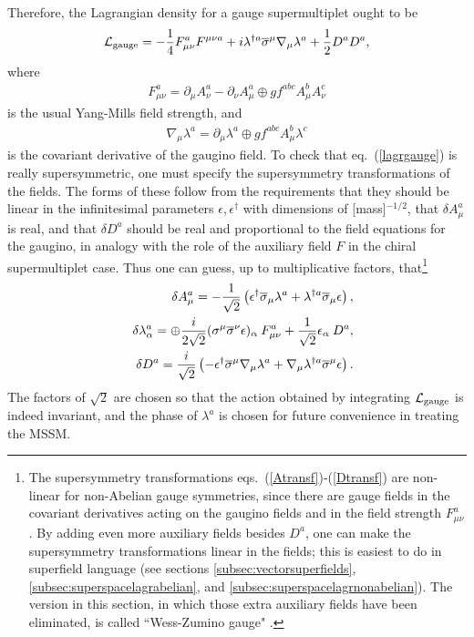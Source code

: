 \documentclass[11pt]{article}
\def\BDneg{-}
\def\BDminus{-}
\def\BDneg{}
\def\BDminus{+}
\def\BDneg{\ominus}
\def\BDminus{\ominus}
\def\BDneg{\oplus}
\def\BDminus{\oplus}
\def\beq{\begin{eqnarray}}
\def\eeq{\end{eqnarray}}
\def\lagr{{\cal L}}
\def\sigmabar{\overline\sigma}
\begin{document}
Therefore, the Lagrangian density for a gauge supermultiplet ought to be
\beq
\lagr_{\rm gauge} = -{1\over 4} F_{\mu\nu}^a F^{\mu\nu a}
+ i \lambda^{\dagger a} \sigmabar^\mu \nabla_\mu \lambda^a
+ {1\over 2} D^a D^a ,
\label{lagrgauge}
\eeq
where
\beq
F^a_{\mu\nu} = \partial_\mu A^a_\nu - \partial_\nu A^a_\mu 
               \BDminus g f^{abc} A^b_\mu A^c_\nu
\label{eq:YMfs}
\eeq
is the usual Yang-Mills field strength, and
\beq
\nabla_\mu \lambda^a = \partial_\mu \lambda^a 
                  \BDminus g f^{abc} A^b_\mu \lambda^c
\label{ordtocovlambda}
\eeq
is the covariant derivative of the gaugino field. To check that
eq.~(\ref{lagrgauge}) is really supersymmetric, one must specify the
supersymmetry transformations of the fields. 
The forms of these follow from the requirements that they should be linear
in the infinitesimal parameters $\epsilon,\epsilon^\dagger$ with
dimensions of [mass]$^{-1/2}$, that $\delta A^a_\mu$ is real, and that
$\delta D^a$ should be real and proportional to the field equations for
the gaugino, in analogy with the role of the auxiliary field $F$ in the
chiral supermultiplet case. Thus one can guess, up to multiplicative
factors, that\footnote{The supersymmetry transformations
eqs.~(\ref{Atransf})-(\ref{Dtransf}) are non-linear for non-Abelian gauge
symmetries, since there are gauge fields in the covariant
derivatives acting on the gaugino fields and in the field strength $F_{\mu
\nu}^a$. By adding even more auxiliary fields besides $D^a$, one can make
the supersymmetry transformations linear in the fields; this is easiest to
do in superfield language (see sections \ref{subsec:vectorsuperfields}, 
\ref{subsec:superspacelagrabelian}, and \ref{subsec:superspacelagrnonabelian}). 
The version in this section, in which those extra auxiliary fields 
have been eliminated, is called ``Wess-Zumino gauge" \cite{WZgauge}.}
\beq
&& \delta A_\mu^a = 
- {1\over \sqrt{2}} \left (\epsilon^\dagger \sigmabar_\mu
\lambda^a + \lambda^{\dagger a} \sigmabar_\mu \epsilon \right )
,
\label{Atransf}
\\
&& \delta \lambda^a_\alpha =
\BDneg {i\over 2\sqrt{2}} (\sigma^\mu \sigmabar^\nu \epsilon)_\alpha
\> F^a_{\mu\nu} + {1\over \sqrt{2}} \epsilon_\alpha\> D^a 
,
\\
&& \delta D^a =  {i\over \sqrt{2}} \left (
-\epsilon^\dagger \sigmabar^\mu \nabla_\mu \lambda^a 
+\nabla_\mu \lambda^{\dagger a} \sigmabar^\mu \epsilon \right ) .
\label{Dtransf}
\eeq
The factors of $\sqrt{2}$ are chosen so that the action obtained by
integrating $\lagr_{\rm gauge}$ is indeed invariant, and the phase of
$\lambda^a$ is chosen for future convenience in treating the MSSM.
\end{document}
